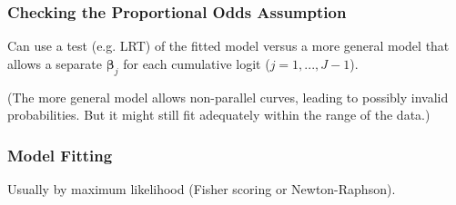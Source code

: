 \documentclass[11pt]{elegantbook}
\begin{document}
\subsubsection*{Checking the Proportional Odds Assumption}
Can use a test (e.g. LRT) of the fitted model versus a more general model that allows a separate $\boldsymbol{\beta}_j$ for each cumulative logit ($j = 1, . . . , J - 1$).

(The more general model allows non-parallel curves, leading to possibly invalid probabilities. But it might still fit adequately within the range of the data.)

\subsubsection*{Model Fitting}
Usually by maximum likelihood (Fisher scoring or Newton-Raphson).
\end{document}
